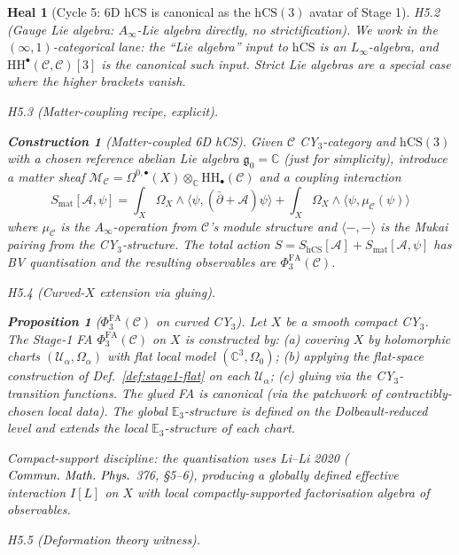 \documentclass[11pt]{article}
\newtheorem{proposition}[theorem]{Proposition}
\newtheorem{construction}[theorem]{Construction}
\newtheorem*{heal}{Heal}
\theoremstyle{definition}
\providecommand{\CC}{\mathbb{C}}
\providecommand{\HH}{\mathrm{HH}}
\providecommand{\fg}{\mathfrak{g}}
\providecommand{\cA}{\mathcal{A}}
\providecommand{\cC}{\mathcal{C}}
\providecommand{\cM}{\mathcal{M}}
\providecommand{\cU}{\mathcal{U}}
\providecommand{\hCS}{\mathrm{hCS}}
\providecommand{\FA}{\mathrm{FA}}
\begin{document}
\begin{heal}[Cycle 5: 6D hCS is canonical as the $\hCS(3)$ avatar of Stage 1]
\emph{H5.2 (Gauge Lie algebra: $A_\infty$-Lie algebra directly, no
strictification).} We work in the $(\infty,1)$-categorical lane: the
``Lie algebra'' input to $\hCS$ is an $L_\infty$-algebra, and
$\HH^\bullet(\cC,\cC)[3]$ is the canonical such input. Strict Lie
algebras are a special case where the higher brackets vanish.

\emph{H5.3 (Matter-coupling recipe, explicit).}

\begin{construction}[Matter-coupled 6D hCS]
\label{cons:matter-coupled}
Given $\cC$ CY$_3$-category and $\hCS(3)$ with a chosen reference
abelian Lie algebra $\fg_0 = \CC$ (just for simplicity), introduce a
matter sheaf $\cM_\cC = \Omega^{0,\bullet}(X) \otimes_\CC \HH_\bullet(\cC)$
and a coupling interaction
\[
  S_{\mathrm{mat}}[\cA, \psi] = \int_X \Omega_X \wedge \langle \psi,
  (\bar\partial + \cA) \psi \rangle + \int_X \Omega_X \wedge \langle \psi,
  \mu_\cC(\psi) \rangle
\]
where $\mu_\cC$ is the $A_\infty$-operation from $\cC$'s module
structure and $\langle -, - \rangle$ is the Mukai pairing from the
CY$_3$-structure. The total action
$S = S_{\hCS}[\cA] + S_{\mathrm{mat}}[\cA, \psi]$ has BV quantisation
and the resulting observables are $\Phi^{\FA}_3(\cC)$.
\end{construction}

\emph{H5.4 (Curved-$X$ extension via gluing).}

\begin{proposition}[$\Phi^{\FA}_3(\cC)$ on curved CY$_3$]
\label{prop:curved-X}
Let $X$ be a smooth compact CY$_3$. The Stage-1 FA
$\Phi^{\FA}_3(\cC)$ on $X$ is constructed by: (a) covering $X$ by
holomorphic charts $(\cU_\alpha, \Omega_\alpha)$ with flat local
model $(\CC^3, \Omega_0)$; (b) applying the flat-space construction
of Def.~\ref{def:stage1-flat} on each $\cU_\alpha$; (c) gluing via the
CY$_3$-transition functions. The glued FA is canonical (via the
patchwork of contractibly-chosen local data). The global
$\mathbb{E}_3$-structure is defined on the Dolbeault-reduced level
and extends the local $\mathbb{E}_3$-structure of each chart.

Compact-support discipline: the quantisation uses Li--Li 2020
($\emph{Commun.~Math.~Phys.}$ 376, \S5--6), producing a globally
defined effective interaction $I[L]$ on $X$ with local
compactly-supported factorisation algebra of observables.
\end{proposition}

\emph{H5.5 (Deformation theory witness).}


\end{heal}
\end{document}
